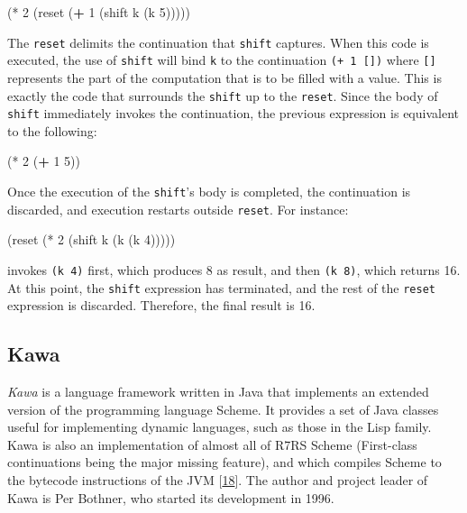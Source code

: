 \documentclass[12pt,a4paper,oneside,openright]{book}
\newenvironment{Shaded}{\begin{snugshade}}{\end{snugshade}}
\newcommand{\KeywordTok}[1]{\textcolor[rgb]{0.13,0.29,0.53}{\textbf{{#1}}}}
\newcommand{\DecValTok}[1]{\textcolor[rgb]{0.00,0.00,0.81}{{#1}}}
\newcommand{\NormalTok}[1]{{#1}}
\begin{document}
\begin{Shaded}
\begin{Highlighting}[]
    \NormalTok{(* }\DecValTok{2} \NormalTok{(reset (}\KeywordTok{+} \DecValTok{1} \NormalTok{(shift k (k }\DecValTok{5}\NormalTok{)))))}
\end{Highlighting}
\end{Shaded}

The \texttt{reset} delimits the continuation that \texttt{shift}
captures. When this code is executed, the use of \texttt{shift} will
bind \texttt{k} to the continuation \texttt{(+\ 1\ {[}{]})} where
\texttt{{[}{]}} represents the part of the computation that is to be
filled with a value. This is exactly the code that surrounds the
\texttt{shift} up to the \texttt{reset}. Since the body of
\texttt{shift} immediately invokes the continuation, the previous
expression is equivalent to the following:

\begin{Shaded}
\begin{Highlighting}[]
    \NormalTok{(* }\DecValTok{2} \NormalTok{(}\KeywordTok{+} \DecValTok{1} \DecValTok{5}\NormalTok{))}
\end{Highlighting}
\end{Shaded}

Once the execution of the \texttt{shift}'s body is completed, the
continuation is discarded, and execution restarts outside
\texttt{reset}. For instance:

\begin{Shaded}
\begin{Highlighting}[]
    \NormalTok{(reset (* }\DecValTok{2} \NormalTok{(shift k (k (k }\DecValTok{4}\NormalTok{)))))}
\end{Highlighting}
\end{Shaded}

invokes \texttt{(k\ 4)} first, which produces 8 as result, and then
\texttt{(k\ 8)}, which returns 16. At this point, the \texttt{shift}
expression has terminated, and the rest of the \texttt{reset} expression
is discarded. Therefore, the final result is 16.

\subsection{Kawa}\label{kawa}

\emph{Kawa} is a language framework written in Java that implements an
extended version of the programming language Scheme. It provides a set
of Java classes useful for implementing dynamic languages, such as those
in the Lisp family. Kawa is also an implementation of almost all of R7RS
Scheme (First-class continuations being the major missing feature), and
which compiles Scheme to the bytecode instructions of the JVM
{[}\hyperref[ref-Kawa2015]{18}{]}. The author and project leader of Kawa
is Per Bothner, who started its development in 1996.
\end{document}
